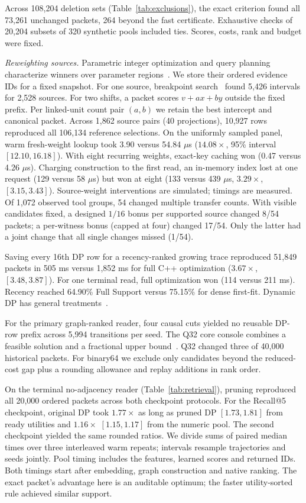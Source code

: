 \documentclass[conference]{IEEEtran}
\begin{document}
Across 108,204 deletion sets (Table~\ref{tab:exclusions}), the exact criterion found all 73,261 unchanged packets, 264 beyond the fast certificate. Exhaustive checks of 20,204 subsets of 320 synthetic pools included ties. Scores, costs, rank and budget were fixed.

\noindent\textit{Reweighting sources.} Parametric integer optimization and query planning characterize winners over parameter regions~\cite{crema,ganguly}. We store their ordered evidence IDs for a fixed snapshot. For one source, breakpoint search~\cite{eisner} found 5,426 intervals for 2,528 sources. For two shifts, a packet scores $v+ax+by$ outside the fixed prefix. Per linked-unit count pair $(a,b)$ we retain the best intercept and canonical packet. Across 1,862 source pairs (40 projections), 10,927 rows reproduced all 106,134 reference selections. On the uniformly sampled panel, warm fresh-weight lookup took 3.90 versus 54.84 $\mu$s ($14.08\times$, 95\% interval $[12.10,16.18]$). With eight recurring weights, exact-key caching won (0.47 versus 4.26 $\mu$s). Charging construction to the first read, an in-memory index lost at one request (129 versus 58 $\mu$s) but won at eight (133 versus 439 $\mu$s, $3.29\times$, $[3.15,3.43]$). Source-weight interventions are simulated; timings are measured. Of 1,072 observed tool groups, 54 changed multiple transfer counts. With visible candidates fixed, a designed $1/16$ bonus per supported source changed 8/54 packets; a per-witness bonus (capped at four) changed 17/54. Only the latter had a joint change that all single changes missed (1/54).

Saving every 16th DP row for a recency-ranked growing trace reproduced 51,849 packets in 505 ms versus 1,852 ms for full C++ optimization ($3.67\times$, $[3.48,3.87]$). For one terminal read, full optimization won (114 versus 211 ms). Recency reached 64.90\% Full Support versus 75.15\% for dense first-fit. Dynamic DP has general treatments~\cite{dynamicdp}.

For the primary graph-ranked reader, four causal cuts yielded no reusable DP-row prefix across 5,994 transitions per seed. The Q32 core console combines a feasible solution and a fractional upper bound~\cite{coreknap}. Q32 changed three of 40,000 historical packets. For binary64 we exclude only candidates beyond the reduced-cost gap plus a rounding allowance and replay additions in rank order.

On the terminal no-adjacency reader (Table~\ref{tab:retrieval}), pruning reproduced all 20,000 ordered packets across both checkpoint protocols. For the Recall@5 checkpoint, original DP took $1.77\times$ as long as pruned DP $[1.73,1.81]$ from ready utilities and $1.16\times$ $[1.15,1.17]$ from the numeric pool. The second checkpoint yielded the same rounded ratios. We divide sums of paired median times over three interleaved warm repeats; intervals resample trajectories and seeds jointly. Pool timing includes the features, learned scores and returned IDs. Both timings start after embedding, graph construction and native ranking. The exact packet's advantage here is an auditable optimum; the faster utility-sorted rule achieved similar support.
\end{document}
